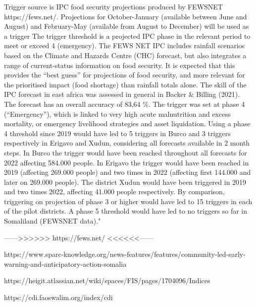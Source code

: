 {{Trigger source is IPC food security projections produced by FEWSNET https://fews.net/. 
Projections for October-January (available between June and August) and  February-May (available from August to December) will be used as a trigger 
The trigger threshold is a projected IPC phase in the relevant period to meet or exceed 4 (emergency). 
The FEWS NET IPC includes rainfall scenarios based on the Climate and Hazards Centre (CHC) forecast, but also integrates a range of current-status information on food security. It is expected that this provides the “best guess” for projections of food security, and more relevant for the prioritised impact (food shortage) than rainfall totals alone. The skill of the IPC forecast in east africa was assessed in general in Backer & Billing (2021). The forecast has an overall accuracy of 83,64 \%. 
The trigger was set at phase 4 (“Emergency”), which is linked to very high acute malnutrition and excess mortality, or emergency livelihood strategies and asset liquidation. 
Using a phase 4 threshold since 2019 would have led to 5 triggers in Burco and 3 triggers respectively in Erigavo and Xudun, considering all forecasts available in 2 month steps. In Burco the trigger would have been reached throughout all forecasts for 2022 affecting 584.000 people. In Erigavo the trigger would have been reached in 2019 (affecting 269.000 people) and two times in 2022 (affecting first 144.000 and later on 269.000 people). The district Xudun would have been triggered in 2019 and two times 2022, affecting 41.000 people respectively.
By comparison, triggering on projection of phase 3 or higher would have led to 15 triggers in each of the pilot districts. A phase 5 threshold would have led to no triggers so far in Somaliland (FEWSNET data)."

------>>>>>> https://fews.net/ <<<<<<------

https://www.sparc-knowledge.org/news-features/features/community-led-early-warning-and-anticipatory-action-somalia

https://heigit.atlassian.net/wiki/spaces/FIS/pages/1704096/Indices

https://cdi.faoswalim.org/index/cdi




}}
